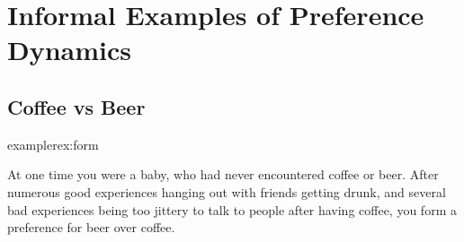 \documentclass{article}
\begin{document}
	\section{Informal Examples of Preference Dynamics}
%	


	\subsection{Coffee vs Beer}
	\begin{restatable}{example}{rex:form} \label{rex:form}

		At one time you were a baby, who had never encountered coffee or beer. After numerous good experiences hanging out with friends getting drunk, and several bad experiences being too jittery to talk to people after having coffee, you form a preference for beer over coffee.
	\end{restatable}
	
\end{document}
